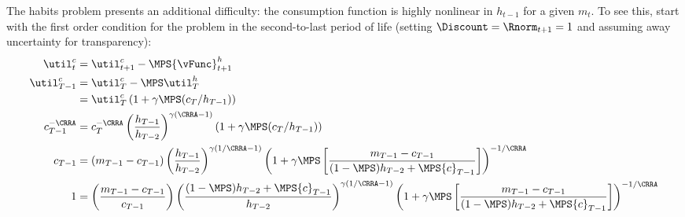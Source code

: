 \documentclass[titlepage]{\econtex}
\begin{document}
{  The habits problem presents an additional difficulty: the consumption
  function is highly nonlinear in $h_{t-1}$ for a given ${m}_{t}$.   To
  see this, start with the first order condition for the problem in the
  second-to-last period of life (setting $\Discount = \Rnorm_{t+1} = 1$ and assuming
  away uncertainty for transparency):
  \begin{equation}\begin{gathered}\begin{aligned}
    \util_{t}^{c}    & = \util_{t+1}^{c} - \MPS {\vFunc}_{t+1}^{h}
    \\      \util_{T-1}^{c}  & = \util_{T}^{c} - \MPS \util_{T}^{h}
    \\   & =  \util_{T}^{c}\left(1 + \gamma \MPS
              ({c}_{T}/h_{T-1})\right)
    \\      {c}_{T-1}^{-\CRRA} 
& =                                      {c}_{T}^{-\CRRA}\left(\frac{h_{T-1}}{h_{T-2}}\right)^{\gamma(\CRRA-1)}\left(1 + \gamma \MPS
                                     ({c}_{T}/h_{T-1})\right)  \\
    {c}_{T-1} 
& =                     ({m}_{T-1}-{c}_{T-1})\left(\frac{h_{T-1}}{h_{T-2}}\right)^{\gamma(1/\CRRA-1)}\left(1 +
                    \gamma \MPS \left[\frac{{m}_{T-1}-{c}_{T-1}}{(1-\MPS)h_{T-2}+\MPS
                    {c}_{T-1}}\right]\right)^{-1/\CRRA}
    \\      1 
& =                     \left(\frac{{m}_{T-1}-{c}_{T-1}}{{c}_{T-1}}\right)\left(\frac{(1-\MPS)h_{T-2}+\MPS {c}_{T-1}}{h_{T-2}}\right)^{\gamma(1/\CRRA-1)}\left(1 +
                    \gamma \MPS \left[\frac{{m}_{T-1}-{c}_{T-1}}{(1-\MPS)h_{T-2}+\MPS
                    {c}_{T-1}}\right]\right)^{-1/\CRRA} \nonumber
    \\ \label{eq:oneeq}
  \end{aligned}\end{gathered}\end{equation}

}
\end{document}

